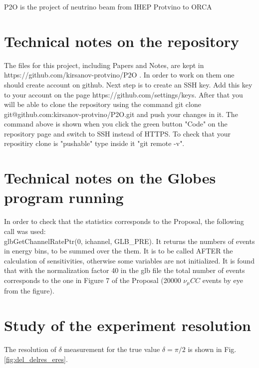 \documentclass[prd,showpacs,groupedaddress,superscriptaddress,amsmath,amssymb]{revtex4-2} %
\begin{document}
 P2O is the project of neutrino beam from IHEP Protvino to ORCA \cite{Akindinov:2019flp}


\section{Technical notes on the repository}


 The files for this project, including Papers and Notes, are kept in https://github.com/kirsanov-protvino/P2O . In order to work
on them one should create account on github. Next step is to create an SSH key. Add this key to your account on the page https://github.com/settings/keys.
After that you will be able to clone the repository using the command git clone git@github.com:kirsanov-protvino/P2O.git and push your changes in it.
The command above is shown when you click the green button "Code" on the repository page and switch to SSH instead of HTTPS.
To check that your repositiry clone is "pushable" type inside it "git remote -v".


\section{Technical notes on the Globes program running}


 In order to check that the statistics corresponds to the Proposal, the following call was used: \\
glbGetChannelRatePtr(0, ichannel, GLB\_PRE).
It returns the numbers of events in energy bins, to be summed over the them. It is to be called AFTER the calculation of sensitivities,
otherwise some variables are not initialized. It is found that with the normalization factor 40 in the glb file the total number of
events corresponds to the one in Figure 7 of the Proposal \cite{Akindinov:2019flp} (20000 $\nu_{\mu}CC$ events by eye from the figure).


\section{Study of the experiment resolution}


 The resolution of $\delta$ measurement for the true value $\delta = \pi/2$ is shown in Fig. \ref{fig:del_delres_eres}.
\end{document}
